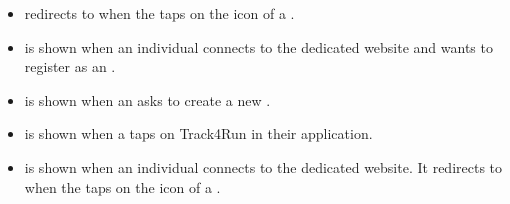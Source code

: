 \documentclass[../DD.tex]{subfiles}
\begin{document}
\begin{itemize}
\begin{itemize}
			\end{itemize}
		\item {} redirects to  when the  taps on the icon of a .
		\item {} is shown when an individual connects to the  dedicated website and wants to register as an .
		\item {} is shown when an  asks to create a new .
		\item {} is shown when a  taps on Track4Run in their application.
		\item {} is shown when an individual connects to the  dedicated website. It redirects to  when the  taps on the icon of a .
	\end{itemize}
\thispagestyle{fancy}
 
\end{document}
